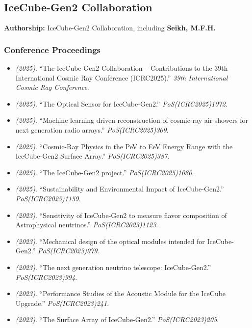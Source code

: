 \subsection{IceCube-Gen2 Collaboration}
\textbf{Authorship:} IceCube-Gen2 Collaboration, including \textbf{Seikh, M.F.H.}
\subsubsection{Conference Proceedings}
\begin{itemize}
\item \textit{(2025)}. ``The IceCube-Gen2 Collaboration -- Contributions to the 39th International Cosmic Ray Conference (ICRC2025).'' \textit{39th International Cosmic Ray Conference}. 
\item \textit{(2025)}. ``The Optical Sensor for IceCube-Gen2.'' \textit{PoS(ICRC2025)1072}.  
\item \textit{(2025)}. ``Machine learning driven reconstruction of cosmic-ray air showers for next generation radio arrays.'' \textit{PoS(ICRC2025)309}.  
\item \textit{(2025)}. ``Cosmic-Ray Physics in the PeV to EeV Energy Range with the IceCube-Gen2 Surface Array.'' \textit{PoS(ICRC2025)387}.  
\item \textit{(2025)}. ``The IceCube-Gen2 project.'' \textit{PoS(ICRC2025)1080}. 
\item \textit{(2025)}. ``Sustainability and Environmental Impact of IceCube-Gen2.'' \textit{PoS(ICRC2025)1159}. 
\item \textit{(2023)}. ``Sensitivity of IceCube-Gen2 to measure flavor composition of Astrophysical neutrinos.'' \textit{PoS(ICRC2023)1123}.  
\item \textit{(2023)}. ``Mechanical design of the optical modules intended for IceCube-Gen2.'' \textit{PoS(ICRC2023)979}.  
\item \textit{(2023)}. ``The next generation neutrino telescope: IceCube-Gen2.'' \textit{PoS(ICRC2023)994}.  
\item \textit{(2023)}. ``Performance Studies of the Acoustic Module for the IceCube Upgrade.'' \textit{PoS(ICRC2023)241}.  
\item \textit{(2023)}. ``The Surface Array of IceCube-Gen2.'' \textit{PoS(ICRC2023)205}.  

\end{itemize}
